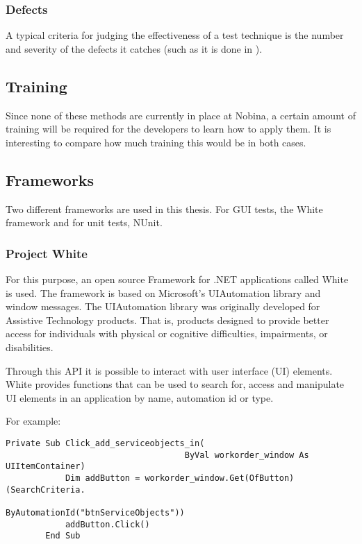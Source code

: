 \documentclass{article}
\begin{document}
			\subsubsection{Defects}
			A typical criteria for judging the effectiveness of a test technique is the number and severity of the defects it catches (such as it is done in \cite{unit}). 

			\subsection{Training}
			Since none of these methods are currently in place at Nobina, a certain amount of training will be required for the developers to learn how to apply them. It is interesting to compare how much training this would be in both cases.

		\subsection{Frameworks}

			Two different frameworks are used in this thesis. For GUI tests, the White framework and for unit tests, NUnit. 

			\subsubsection{Project White}
			For this purpose, an open source Framework for .NET applications called White is used. The framework is based on Microsoft's UIAutomation library and window messages. The UIAutomation library was originally developed for Assistive Technology products. That is, products designed to provide better access for individuals with physical or cognitive difficulties, impairments, or disabilities. \cite{white}

			Through this API it is possible to interact with user interface (UI) elements. 
			White provides functions that can be used to search for, access and manipulate UI elements in an application by name, automation id or type. 

			For example:

			\begin{lstlisting}[caption=A method which finds a button with id {\em btnServiceObjects} and clicks on it.]
		Private Sub Click_add_serviceobjects_in(
									ByVal workorder_window As UIItemContainer)
			Dim addButton = workorder_window.Get(OfButton)(SearchCriteria.
												ByAutomationId("btnServiceObjects"))
			addButton.Click()
		End Sub
			\end{lstlisting}
			
\end{document}
